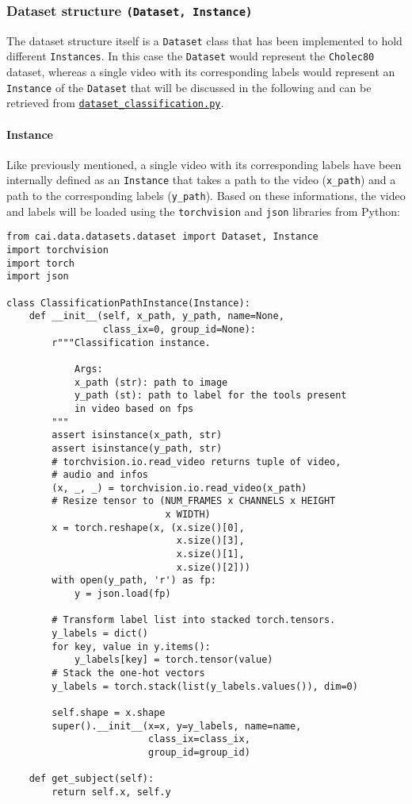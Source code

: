 \documentclass{article}
\begin{document}
\subsubsection{Dataset structure \texttt{(Dataset, Instance)}}
The dataset structure itself is a \texttt{Dataset} class that has been implemented to hold different \texttt{Instances}. In this case the \texttt{Dataset} would represent the \texttt{Cholec80} dataset, whereas a single video with its corresponding labels would represent an \texttt{Instance} of the \texttt{Dataset} that will be discussed in the following and can be retrieved from \href{https://github.com/amrane99/CAI-Classification/blob/AR/cai/data/datasets/dataset_classification.py}{\texttt{dataset\_classification.py}}.

\paragraph{Instance}
Like previously mentioned, a single video with its corresponding labels have been internally defined as an \texttt{Instance} that takes a path to the video (\texttt{x\_path}) and a path to the corresponding labels (\texttt{y\_path}). Based on these informations, the video and labels will be loaded using the \texttt{torchvision} and \texttt{json} libraries from Python:
\begin{verbatim}
from cai.data.datasets.dataset import Dataset, Instance
import torchvision
import torch
import json

class ClassificationPathInstance(Instance):
    def __init__(self, x_path, y_path, name=None, 
                 class_ix=0, group_id=None):
        r"""Classification instance.

            Args:
            x_path (str): path to image
            y_path (st): path to label for the tools present
            in video based on fps
        """
        assert isinstance(x_path, str)
        assert isinstance(y_path, str)
        # torchvision.io.read_video returns tuple of video, 
        # audio and infos
        (x, _, _) = torchvision.io.read_video(x_path)
        # Resize tensor to (NUM_FRAMES x CHANNELS x HEIGHT 
                            x WIDTH)
        x = torch.reshape(x, (x.size()[0], 
                              x.size()[3],
                              x.size()[1],
                              x.size()[2]))
        with open(y_path, 'r') as fp:
            y = json.load(fp)
            
        # Transform label list into stacked torch.tensors.
        y_labels = dict()
        for key, value in y.items():
            y_labels[key] = torch.tensor(value)
        # Stack the one-hot vectors
        y_labels = torch.stack(list(y_labels.values()), dim=0)

        self.shape = x.shape
        super().__init__(x=x, y=y_labels, name=name,
                         class_ix=class_ix, 
                         group_id=group_id)

    def get_subject(self):
        return self.x, self.y
\end{verbatim}        
        
\end{document}
